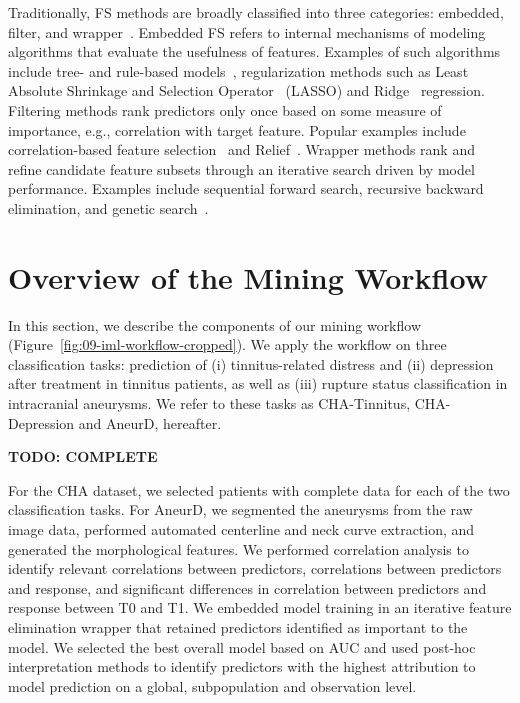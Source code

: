\documentclass[
  oneside]{book}
\begin{document}
Traditionally, FS methods are broadly classified into three categories: embedded, filter, and wrapper~\autocite{Guyon:RFE2003}.
Embedded FS refers to internal mechanisms of modeling algorithms that evaluate the usefulness of features.
Examples of such algorithms include tree- and rule-based models~\autocite{Quinlan:C451993,kuhn2013applied}, regularization methods such as Least Absolute Shrinkage and Selection Operator~\autocite{lasso} (LASSO) and Ridge~\autocite{ridge} regression.
Filtering methods rank predictors only once based on some measure of importance, e.g., correlation with target feature.
Popular examples include correlation-based feature selection~\autocite{Hall:CFS2000} and Relief~\autocite{kira1992feature}.
Wrapper methods rank and refine candidate feature subsets through an iterative search driven by model performance.
Examples include sequential forward search, recursive backward elimination, and genetic search~\autocite{chandrashekar2014survey}.

\hypertarget{iml-workflow}{%
\section{Overview of the Mining Workflow}\label{iml-workflow}}

In this section, we describe the components of our mining workflow (Figure~\ref{fig:09-iml-workflow-cropped}).
We apply the workflow on three classification tasks: prediction of (i) tinnitus-related distress and (ii) depression after treatment in tinnitus patients, as well as (iii) rupture status classification in intracranial aneurysms.
We refer to these tasks as CHA-Tinnitus, CHA-Depression and AneurD, hereafter.

\textbf{TODO: COMPLETE}



For the CHA dataset, we selected patients with complete data for each of the two classification tasks. For AneurD, we segmented the aneurysms from the raw image data, performed automated centerline and neck curve extraction, and generated the morphological features. We performed correlation analysis to identify relevant correlations between predictors, correlations between predictors and response, and significant differences in correlation between predictors and response between T0 and T1. We embedded model training in an iterative feature elimination wrapper that retained predictors identified as important to the model. We selected the best overall model based on AUC and used post-hoc interpretation methods to identify predictors with the highest attribution to model prediction on a global, subpopulation and observation level.
\end{document}
